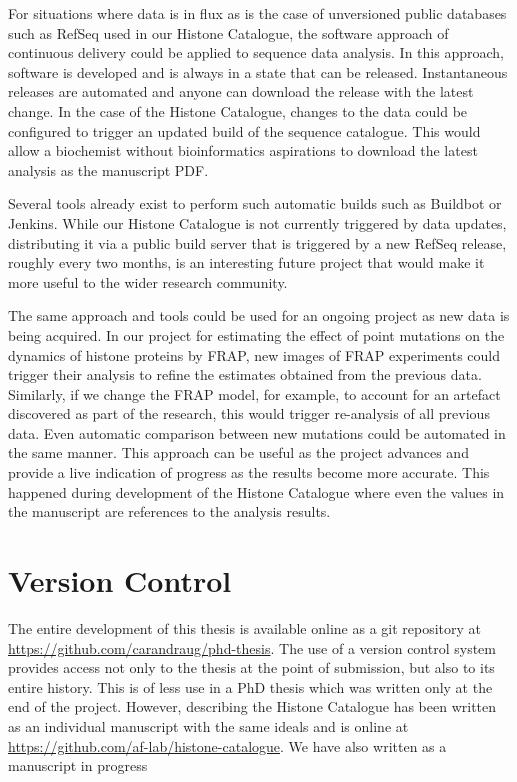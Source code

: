 For situations where data is in
flux as is the case of unversioned public databases such as RefSeq
used in our Histone Catalogue, the software
approach of continuous delivery could be applied to sequence data
analysis.  In this approach,
software is developed and is always in a state that can be
released.  Instantaneous releases are automated and anyone can download the
release with the latest change.  In the case of the Histone Catalogue,
changes to the data could be configured to
trigger an updated
build of the sequence catalogue.  This would allow a biochemist
without bioinformatics aspirations to download the latest analysis as
the manuscript PDF.

Several tools already exist to perform such automatic builds such as
Buildbot or Jenkins.  While our Histone Catalogue is not currently
triggered by data updates, distributing it via a public build server
that is triggered by a new RefSeq release, roughly every two months,
is an interesting future project that would make it more useful to the
wider research community.

The same approach and tools could be used for an ongoing project as
new data is being acquired.  In our project for
estimating the effect of point mutations on the dynamics of histone
proteins by FRAP, new images of FRAP experiments could trigger
their analysis to refine the
estimates obtained from the previous data.  Similarly, if we change
the FRAP model, for example, to account for an artefact
discovered as part of the research, this would trigger re-analysis of
all previous data.  Even automatic comparison between new mutations
could be automated in the same manner.
This approach can be useful as the project
advances and provide a live indication of progress as the results become more
accurate.
This happened during development of the Histone Catalogue where even
the values in the manuscript are references to the analysis results.

\section{Version Control}

The entire development of this thesis is available online as a git
repository at \url{https://github.com/carandraug/phd-thesis}.  The use
of a version control system provides access not only to the thesis at the
point of submission, but also to its entire history.
This is of less use
in a PhD thesis which was written only at the end of the
project.
However,  describing the Histone Catalogue
has been written as an individual
manuscript with the same ideals and is online at
\url{https://github.com/af-lab/histone-catalogue}.
We have also written  as a manuscript in progress

